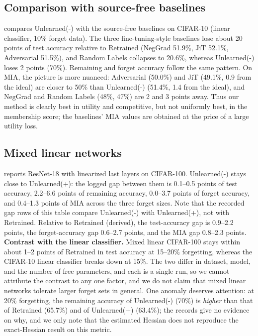 \documentclass[10pt,twocolumn,letterpaper]{article}
\begin{document}
\subsection{Comparison with source-free baselines}
\label{sec:baselines}
 compares Unlearned(-) with the source-free baselines on CIFAR-10 (linear classifier, 10\% forget data). The three fine-tuning-style baselines lose about 20 points of test accuracy relative to Retrained (NegGrad 51.9\%, JiT 52.1\%, Adversarial 51.5\%), and Random Labels collapses to 20.6\%, whereas Unlearned(-) loses 2 points (70\%). Remaining and forget accuracy follow the same pattern. On MIA, the picture is more nuanced: Adversarial (50.0\%) and JiT (49.1\%, 0.9 from the ideal) are closer to 50\% than Unlearned(-) (51.4\%, 1.4 from the ideal), and NegGrad and Random Labels (48\%, 47\%) are 2 and 3 points away. Thus our method is clearly best in utility and competitive, but not uniformly best, in the membership score; the baselines' MIA values are obtained at the price of a large utility loss.



\subsection{Mixed linear networks}
\label{sec:mixed}
 reports ResNet-18 with linearized last layers on CIFAR-100. Unlearned(-) stays close to Unlearned(+): the logged gap between them is 0.1--0.5 points of test accuracy, 2.2--6.6 points of remaining accuracy, 0.0--3.7 points of forget accuracy, and 0.4--1.3 points of MIA across the three forget sizes. Note that the recorded gap rows of this table compare Unlearned(-) with Unlearned(+), not with Retrained. Relative to Retrained (derived), the test-accuracy gap is 0.9--2.2 points, the forget-accuracy gap 0.6--2.7 points, and the MIA gap 0.8--2.3 points. \noindent\textbf{Contrast with the linear classifier.} Mixed linear CIFAR-100 stays within about 1--2 points of Retrained in test accuracy at 15--20\% forgetting, whereas the CIFAR-10 linear classifier breaks down at 15\%. The two differ in dataset, model, and the number of free parameters, and each is a single run, so we cannot attribute the contrast to any one factor, and we do not claim that mixed linear networks tolerate larger forget sets in general. One anomaly deserves attention: at 20\% forgetting, the remaining accuracy of Unlearned(-) (70\%) is \emph{higher} than that of Retrained (65.7\%) and of Unlearned(+) (63.4\%); the records give no evidence on why, and we only note that the estimated Hessian does not reproduce the exact-Hessian result on this metric.
\end{document}
